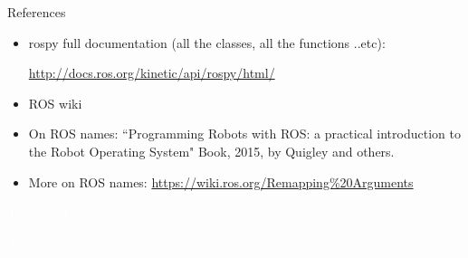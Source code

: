 \documentclass{beamer}
\begin{document}
\begin{frame}[fragile]{References}


\begin{itemize}
    \item rospy full documentation (all the classes, all the functions ..etc):
    
    \vspace{0.5cm}
     \url{http://docs.ros.org/kinetic/api/rospy/html/}
     
    \item ROS wiki
    
    \item On ROS names: ``Programming Robots with ROS: a practical introduction to the Robot Operating System" Book, 2015, by Quigley and others.
    
    \item More on ROS names: \url{https://wiki.ros.org/Remapping%20Arguments}
\end{itemize}
    
\end{frame}


\begin{frame}[plain]{}  
    \centering
    {\huge \textcolor{white}{Thank you}}
    
    \vspace{0.5cm}
    
    {\huge \textcolor{white}{Any questions?}}
\end{frame}
\end{document}

